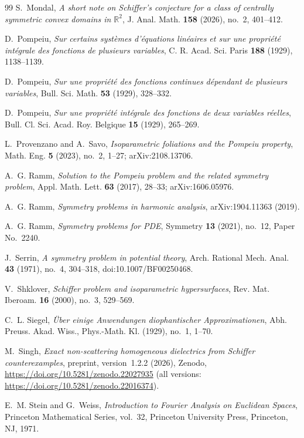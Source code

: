 \documentclass[11pt]{amsart}
\theoremstyle{definition}
\theoremstyle{remark}
\numberwithin{equation}{section}
\begin{document}
\begin{thebibliography}{99}
S.~Mondal, \emph{A short note on Schiffer's conjecture for a class of centrally symmetric convex domains in $\mathbb R^2$}, J. Anal. Math. \textbf{158} (2026), no.~2, 401--412.

D.~Pompeiu, \emph{Sur certains syst\`emes d'\'equations lin\'eaires et sur une propri\'et\'e int\'egrale des fonctions de plusieurs variables}, C. R. Acad. Sci. Paris \textbf{188} (1929), 1138--1139.

D.~Pompeiu, \emph{Sur une propri\'et\'e des fonctions continues d\'ependant de plusieurs variables}, Bull. Sci. Math. \textbf{53} (1929), 328--332.

D.~Pompeiu, \emph{Sur une propri\'et\'e int\'egrale des fonctions de deux variables r\'eelles}, Bull. Cl. Sci. Acad. Roy. Belgique \textbf{15} (1929), 265--269.

L.~Provenzano and A.~Savo, \emph{Isoparametric foliations and the Pompeiu property}, Math. Eng. \textbf{5} (2023), no.~2, 1--27; arXiv:2108.13706.

A.~G. Ramm, \emph{Solution to the Pompeiu problem and the related symmetry problem}, Appl. Math. Lett. \textbf{63} (2017), 28--33; arXiv:1606.05976.

A.~G. Ramm, \emph{Symmetry problems in harmonic analysis}, arXiv:1904.11363 (2019).

A.~G. Ramm, \emph{Symmetry problems for PDE}, Symmetry \textbf{13} (2021), no.~12, Paper No.~2240.

J.~Serrin, \emph{A symmetry problem in potential theory}, Arch. Rational Mech. Anal. \textbf{43} (1971), no.~4, 304--318, doi:10.1007/BF00250468.

V.~Shklover, \emph{Schiffer problem and isoparametric hypersurfaces}, Rev. Mat. Iberoam. \textbf{16} (2000), no.~3, 529--569.

C.~L. Siegel, \emph{\"Uber einige Anwendungen diophantischer Approximationen}, Abh. Preuss. Akad. Wiss., Phys.-Math. Kl. (1929), no.~1, 1--70.

M.~Singh, \emph{Exact non-scattering homogeneous dielectrics from Schiffer counterexamples}, preprint, version~1.2.2 (2026), Zenodo, \url{https://doi.org/10.5281/zenodo.22027935} (all versions: \url{https://doi.org/10.5281/zenodo.22016374}).

E.~M. Stein and G.~Weiss, \emph{Introduction to Fourier Analysis on Euclidean Spaces}, Princeton Mathematical Series, vol.~32, Princeton University Press, Princeton, NJ, 1971.


\end{thebibliography}
\end{document}
